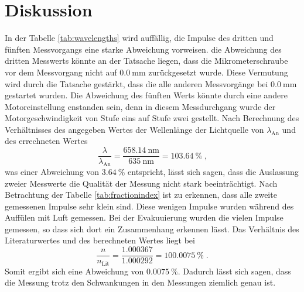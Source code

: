 \section{Diskussion}
\label{sec:Diskussion}
In der Tabelle \ref{tab:wavelengths} wird auffällig, die Impulse des dritten und fünften Messvorgangs eine starke Abweichung vorweisen.
die Abweichung des dritten Messwerts könnte an der Tatsache liegen, dass die Mikrometerschraube vor dem Messvorgang nicht auf $\SI{0.0}{\milli\metre}$
zurückgesetzt wurde. 
Diese Vermutung wird durch die Tatsache gestärkt, dass die alle anderen Messvorgänge bei  $\SI{0.0}{\milli\metre}$ gestartet wurden.
Die Abweichung des fünften Werts könnte durch eine andere Motoreinstellung enstanden sein, denn in diesem Messdurchgang wurde der Motorgeschwindigkeit von Stufe
eins auf Stufe zwei gestellt.
Nach Berechnung des Verhältnisses des angegeben Wertes der Wellenlänge der Lichtquelle von $\lambda_\text{An}$ und des errechneten Wertes 
\begin{equation*}
    \frac{\lambda}{\lambda_\text{An}} = \frac{\SI{658.14}{\nano\metre}}{\SI{635}{\nano\metre}} = \SI{103.64}{\percent} \; \text{,}
\end{equation*}
was einer Abweichung von $\SI{3.64}{\percent}$ entspricht, lässt sich sagen, dass die Auslassung zweier Messwerte die Qualität der Messung nicht 
stark beeinträchtigt.
Nach Betrachtung der Tabelle \ref{tab:fractionindex} ist zu erkennen, dass alle zweite gemessenen Impulse sehr klein sind. 
Diese wenigen Impulse wurden während des Auffülen mit Luft gemessen. 
Bei der Evakuuierung wurden die vielen Impulse gemessen, so dass sich dort ein Zusammenhang erkennen lässt.
Das Verhältnis des Literaturwertes\cite{fractionindex} und des berechneten Wertes liegt bei 
\begin{equation*}
    \frac{n}{n_\text{Lit}} = \frac{\num{1.000367}}{\num{1.000292}} = \SI{100.0075}{\percent} \; \text{.}
\end{equation*}
Somit ergibt sich eine Abweichung  von $\SI{0.0075}{\percent}$. 
Dadurch lässt sich sagen, dass die Messung trotz den Schwankungen in den Messungen ziemlich genau ist.